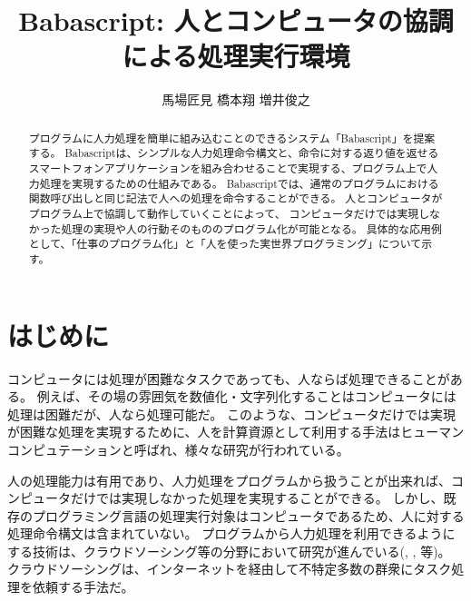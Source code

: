 \documentclass[twoside]{wiss}
\begin{document}
\title{Babascript: 人とコンピュータの協調による処理実行環境}
\etitle{} %

\author{{馬場匠見} \hspace{1em}
        {橋本翔} \hspace{1em}
        {増井俊之
        }
        }

\begin{abstract}
プログラムに人力処理を簡単に組み込むことのできるシステム「Babascript」を提案する。
Babascriptは、シンプルな人力処理命令構文と、命令に対する返り値を返せるスマートフォンアプリケーションを組み合わせることで実現する、プログラム上で人力処理を実現するための仕組みである。
Babascriptでは、通常のプログラムにおける関数呼び出しと同じ記法で人への処理を命令することができる。
人とコンピュータがプログラム上で協調して動作していくことによって、
コンピュータだけでは実現しなかった処理の実現や人の行動そのもののプログラム化が可能となる。
具体的な応用例として、「仕事のプログラム化」と「人を使った実世界プログラミング」について示す。
\end{abstract}

\maketitle

\section{はじめに}
コンピュータには処理が困難なタスクであっても、人ならば処理できることがある。
例えば、その場の雰囲気を数値化・文字列化することはコンピュータには処理は困難だが、人なら処理可能だ。
このような、コンピュータだけでは実現が困難な処理を実現するために、人を計算資源として利用する手法はヒューマンコンピュテーション\cite{humancomputation}と呼ばれ、様々な研究が行われている。

人の処理能力は有用であり、人力処理をプログラムから扱うことが出来れば、コンピュータだけでは実現しなかった処理を実現することができる。
しかし、既存のプログラミング言語の処理実行対象はコンピュータであるため、人に対する処理命令構文は含まれていない。
プログラムから人力処理を利用できるようにする技術は、クラウドソーシング等の分野において研究が進んでいる(\cite{automan}, \cite{crowddb}, \cite{crowdforge}等)。
クラウドソーシングは、インターネットを経由して不特定多数の群衆にタスク処理を依頼する手法だ\cite{riseofcrowdsourcing}。
\end{document}
